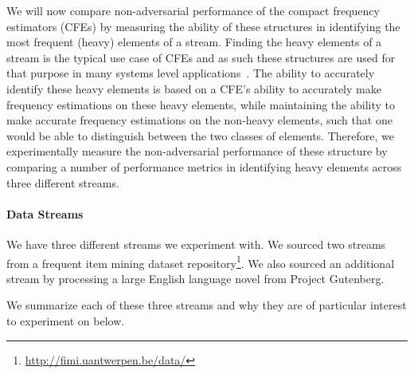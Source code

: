 %
We will now compare non-adversarial performance of the compact frequency estimators (CFEs) by measuring the ability of these structures in identifying the most frequent (heavy) elements of a stream. Finding the heavy elements of a stream is the typical use case of CFEs and as such these structures are used for that purpose in many systems level applications~\cite{yang2019heavykeeper,mandal2018topkapi,radu2010,metwally2006,cormode2005improved,charikar2002finding,manku2002approximate}. The ability to accurately identify these heavy elements is based on a CFE's ability to accurately make frequency estimations on these heavy elements, while maintaining the ability to make accurate frequency estimations on the non-heavy elements, such that one would be able to distinguish between the two classes of elements. Therefore, we experimentally measure the non-adversarial performance of these structure by comparing a number of performance metrics in identifying heavy elements across three different streams. 

\paragraph{Data Streams} We have three different streams we experiment with. We sourced two streams from a frequent item mining dataset repository\footnote{\url{http://fimi.uantwerpen.be/data/}}. We also sourced an additional stream by processing a large English language novel from Project Gutenberg. %

We summarize each of these three streams and why they are of particular interest to experiment on below.

